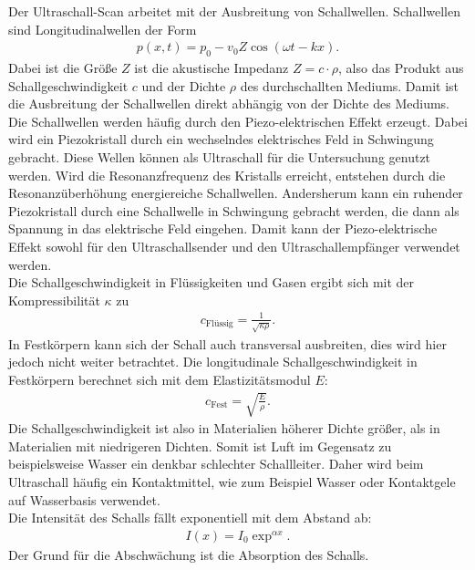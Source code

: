 Der Ultraschall-Scan arbeitet mit der Ausbreitung von Schallwellen.
Schallwellen sind Longitudinalwellen der Form
\begin{align*}
  p(x, t)= p_{\text{0}}-v_{\text{0}}Z \cos{(\omega t -k x)}.
\end{align*}
Dabei ist die Größe $Z$ ist die akustische Impedanz $Z=c \cdot \rho$, also das Produkt aus Schallgeschwindigkeit $c$ und der Dichte $\rho$ des durchschallten Mediums.
Damit ist die Ausbreitung der Schallwellen direkt abhängig von der Dichte des Mediums.
\\ Die Schallwellen werden häufig durch den Piezo-elektrischen Effekt erzeugt.
Dabei wird ein Piezokristall durch ein wechselndes elektrisches Feld in Schwingung gebracht.
Diese Wellen können als Ultraschall für die Untersuchung genutzt werden.
Wird die Resonanzfrequenz des Kristalls erreicht, entstehen durch die Resonanzüberhöhung energiereiche Schallwellen.
Andersherum kann ein ruhender Piezokristall durch eine Schallwelle in Schwingung gebracht werden, die dann als Spannung in das elektrische Feld eingehen.
Damit kann der Piezo-elektrische Effekt sowohl für den Ultraschallsender und den Ultraschallempfänger verwendet werden.
\\Die Schallgeschwindigkeit in Flüssigkeiten und Gasen ergibt sich mit der Kompressibilität $\kappa$ zu
\begin{align}
  c_{\text{Flüssig}}=\frac{1}{\sqrt{\kappa \rho}}.
  \label{eqn:flüssig}
\end{align}
In Festkörpern kann sich der Schall auch transversal ausbreiten, dies wird hier jedoch nicht weiter betrachtet.
Die longitudinale Schallgeschwindigkeit in Festkörpern berechnet sich mit dem Elastizitätsmodul $E$:
\begin{align}
  c_{\text{Fest}}=\sqrt{\frac{E}{\rho}}.
  \label{eqn:fest}
\end{align}
Die Schallgeschwindigkeit ist also in Materialien höherer Dichte größer, als in Materialien mit niedrigeren Dichten.
Somit ist Luft im Gegensatz zu beispielsweise Wasser ein denkbar schlechter Schallleiter.
Daher wird beim Ultraschall häufig ein Kontaktmittel, wie zum Beispiel Wasser oder Kontaktgele auf Wasserbasis verwendet.
\\Die Intensität des Schalls fällt exponentiell mit dem Abstand ab:
\begin{align*}
  I(x)=I_{\text{0}} \exp^{\alpha x}.
\end{align*}
Der Grund für die Abschwächung ist die Absorption des Schalls.

